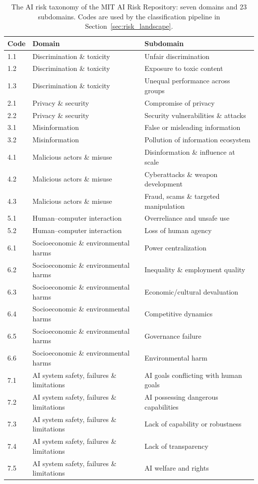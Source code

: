 \documentclass[a4paper,fleqn]{cas-dc}
\begin{document}
\begin{table}[htbp]
\centering
\caption{The AI risk taxonomy of the MIT AI Risk Repository:
seven domains and 23 subdomains. Codes are used by the
classification pipeline in Section~\ref{sec:risk_landscape}.}
\label{tab:taxonomy_full}
\footnotesize
\begin{tabular}{lll}
\toprule
\textbf{Code} & \textbf{Domain} & \textbf{Subdomain} \\
\midrule
1.1 & Discrimination \& toxicity          & Unfair discrimination \\
1.2 & Discrimination \& toxicity          & Exposure to toxic content \\
1.3 & Discrimination \& toxicity          & Unequal performance across groups \\
\midrule
2.1 & Privacy \& security                 & Compromise of privacy \\
2.2 & Privacy \& security                 & Security vulnerabilities \& attacks \\
\midrule
3.1 & Misinformation                      & False or misleading information \\
3.2 & Misinformation                      & Pollution of information ecosystem \\
\midrule
4.1 & Malicious actors \& misuse          & Disinformation \& influence at scale \\
4.2 & Malicious actors \& misuse          & Cyberattacks \& weapon development \\
4.3 & Malicious actors \& misuse          & Fraud, scams \& targeted manipulation \\
\midrule
5.1 & Human--computer interaction         & Overreliance and unsafe use \\
5.2 & Human--computer interaction         & Loss of human agency \\
\midrule
6.1 & Socioeconomic \& environmental harms & Power centralization \\
6.2 & Socioeconomic \& environmental harms & Inequality \& employment quality \\
6.3 & Socioeconomic \& environmental harms & Economic/cultural devaluation \\
6.4 & Socioeconomic \& environmental harms & Competitive dynamics \\
6.5 & Socioeconomic \& environmental harms & Governance failure \\
6.6 & Socioeconomic \& environmental harms & Environmental harm \\
\midrule
7.1 & AI system safety, failures \& limitations & AI goals conflicting with human goals \\
7.2 & AI system safety, failures \& limitations & AI possessing dangerous capabilities \\
7.3 & AI system safety, failures \& limitations & Lack of capability or robustness \\
7.4 & AI system safety, failures \& limitations & Lack of transparency \\
7.5 & AI system safety, failures \& limitations & AI welfare and rights \\
\bottomrule
\end{tabular}
\end{table}
\end{document}
